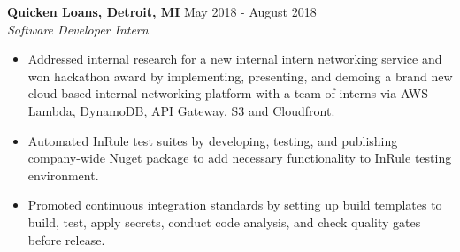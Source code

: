 \documentclass[overlapped]{res}
\begin{document}
\begin{resume}
\textbf{Quicken Loans, Detroit, MI} \hfill May 2018 - August 2018 \\
{\sl Software Developer Intern}
\begin{itemize}  \itemsep -2pt %

    \item Addressed internal research for a new internal intern networking service
    and won hackathon award
    by implementing, presenting, and demoing 
    a brand new cloud-based internal
    networking platform with a team of interns via
    AWS Lambda, DynamoDB, API Gateway, S3 and Cloudfront.

    \item Automated InRule test suites by developing, testing, and publishing
    company-wide Nuget package to add
    necessary functionality to InRule testing environment.

    \item Promoted continuous integration standards by setting up build templates to build,
    test, apply secrets, conduct code analysis,
    and check quality gates before release.









\end{itemize}
\end{resume}
\end{document}
